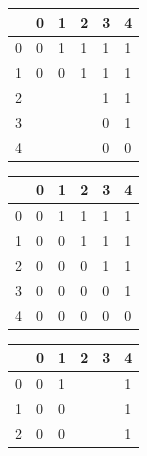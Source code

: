 \documentclass[12pt]{article}
\begin{document}
\begin{figure}[h]
\centering 
	\begin{minipage}{0.25\textwidth}
		\begin{tabular}{|l|lllll|}
		\hline
		    & 0 & 1 & 2 & 3 & 4 \\\hline
		0   & 0 & 1 & 1 & 1 & 1 \\
		1   & 0 & 0 & 1 & 1 & 1 \\
		2   & \cellcolor{purple!75}{\textcolor{white}{0}} & \cellcolor{purple!75}{\textcolor{white}{0}} & \cellcolor{purple!75}{\textcolor{white}{0}} & 1 & 1 \\
		3   & \cellcolor{purple!75}{\textcolor{white}{0}} & \cellcolor{purple!75}{\textcolor{white}{0}} & \cellcolor{purple!75}{\textcolor{white}{0}} & 0 & 1 \\
		4   & \cellcolor{purple!75}{\textcolor{white}{0}} & \cellcolor{purple!75}{\textcolor{white}{0}} & \cellcolor{purple!75}{\textcolor{white}{0}} & 0 & 0\\\hline
		\end{tabular}
	\end{minipage}
	\begin{minipage}{0.25\textwidth}
		\begin{tabular}{|l|lllll|}
		\hline
		    & 0 & 1 & 2 & 3 & 4 \\\hline
		0   & \cellcolor{orange!75}0 & 1 & \cellcolor{orange!75}1 & 1 & \cellcolor{orange!75}1 \\
		1   & \cellcolor{orange!75}0 & 0 & \cellcolor{orange!75}1 & 1 & \cellcolor{orange!75}1 \\
		2   & 0 & 0 & 0 & 1 & 1 \\
		3   & \cellcolor{orange!75}0 & 0 & \cellcolor{orange!75}0 & 0 & \cellcolor{orange!75}1 \\
		4   & 0 & 0 & 0 & 0 & 0\\\hline
		\end{tabular}   
	\end{minipage}
	\begin{minipage}{0.25\textwidth}
		\begin{tabular}{|l|lllll|}
		\hline
		    & 0 & 1 & 2 & 3 & 4 \\\hline
		0   & 0 & 1 & \cellcolor{black!75}{\textcolor{white}{1}} & \cellcolor{black!75}{\textcolor{white}{1}} & 1 \\
		1   & 0 & 0 & \cellcolor{black!75}{\textcolor{white}{1}} & \cellcolor{black!75}{\textcolor{white}{1}} & 1 \\
		2   & 0 & 0 & \cellcolor{black!75}{\textcolor{white}{0}} & \cellcolor{black!75}{\textcolor{white}{1}} & 1 \\

\end{tabular}
\end{minipage}
\end{figure}
\end{document}
